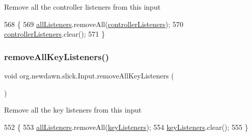Remove all the controller listeners from this input 
\begin{DoxyCode}
568                                                \{
569         \mbox{\hyperlink{classorg_1_1newdawn_1_1slick_1_1_input_a26d5ed77d8b0444118d630336d0ab6d7}{allListeners}}.removeAll(\mbox{\hyperlink{classorg_1_1newdawn_1_1slick_1_1_input_a762495b937bf0e42b5dbfaa29bdb1b98}{controllerListeners}});
570         \mbox{\hyperlink{classorg_1_1newdawn_1_1slick_1_1_input_a762495b937bf0e42b5dbfaa29bdb1b98}{controllerListeners}}.clear();
571     \}
\end{DoxyCode}
\mbox{\label{classorg_1_1newdawn_1_1slick_1_1_input_ae9aa4789e13f1528ae603939684a4237}} 
\subsubsection{\texorpdfstring{remove\+All\+Key\+Listeners()}{removeAllKeyListeners()}}
{\footnotesize\ttfamily void org.\+newdawn.\+slick.\+Input.\+remove\+All\+Key\+Listeners (\begin{DoxyParamCaption}{ }\end{DoxyParamCaption})\hspace{0.3cm}{\ttfamily [inline]}}

Remove all the key listeners from this input 
\begin{DoxyCode}
552                                         \{
553         \mbox{\hyperlink{classorg_1_1newdawn_1_1slick_1_1_input_a26d5ed77d8b0444118d630336d0ab6d7}{allListeners}}.removeAll(\mbox{\hyperlink{classorg_1_1newdawn_1_1slick_1_1_input_a9a68e6a9e9441fea9793f57603be2f96}{keyListeners}});
554         \mbox{\hyperlink{classorg_1_1newdawn_1_1slick_1_1_input_a9a68e6a9e9441fea9793f57603be2f96}{keyListeners}}.clear();
555     \}
\end{DoxyCode}
\mbox{\label{classorg_1_1newdawn_1_1slick_1_1_input_a2d1fb1bdc057a913bbc24f283f248edf}} 
